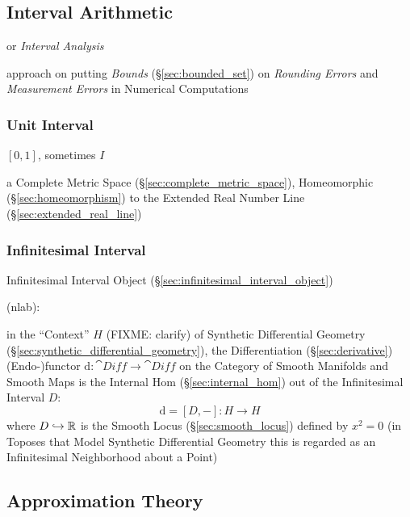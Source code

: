 \subsection{Interval Arithmetic}\label{sec:interval_arithmetic}

or \emph{Interval Analysis}

approach on putting \emph{Bounds} (\S\ref{sec:bounded_set}) on \emph{Rounding
  Errors} and \emph{Measurement Errors} in Numerical Computations



\subsubsection{Unit Interval}\label{sec:unit_interval}

$[0,1]$, sometimes $I$

a Complete Metric Space (\S\ref{sec:complete_metric_space}),
Homeomorphic (\S\ref{sec:homeomorphism}) to the Extended Real Number
Line (\S\ref{sec:extended_real_line})



\subsubsection{Infinitesimal Interval}\label{sec:infinitesimal_interval}

\fist Infinitesimal Interval Object (\S\ref{sec:infinitesimal_interval_object})

(nlab):

in the ``Context'' $H$ (FIXME: clarify) of Synthetic Differential Geometry
(\S\ref{sec:synthetic_differential_geometry}), the Differentiation
(\S\ref{sec:derivative}) (Endo-)functor $\mathrm{d} : \cat{Diff} \rightarrow
\cat{Diff}$ on the Category of Smooth Manifolds and Smooth Maps is the Internal
Hom (\S\ref{sec:internal_hom}) out of the Infinitesimal Interval $D$:
\[
  \mathrm{d} = [D,-] : H \rightarrow H
\]
where $D \hookrightarrow \mathbb{R}$ is the Smooth Locus (\S\ref{sec:smooth_locus})
defined by $x^2 = 0$ (in Toposes that Model Synthetic Differential Geometry this
is regarded as an Infinitesimal Neighborhood about a Point)



\subsection{Approximation Theory}\label{sec:approximation_theory}

